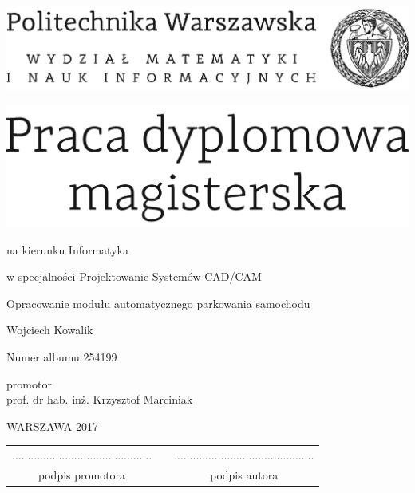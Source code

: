 \documentclass[12pt,twoside,a4paper]{article}
\newcommand{\discipline}{Informatyka}
\newcommand{\spec}{Projektowanie Systemów CAD/CAM}
\renewcommand{\title}{Opracowanie modułu automatycznego parkowania samochodu }
\renewcommand{\author}{Wojciech Kowalik}
\newcommand{\supervisor}{prof. dr hab. inż. Krzysztof Marciniak}
\newcommand{\album}{254199}
\renewcommand{\year}{2017}
\begin{document}
\pagestyle{empty}

\begin{center}
\includegraphics[scale=1.]{politechnika} 
\vspace{70pt}


\includegraphics[scale=1.]{praca_mgr} %

{ \arial na kierunku \discipline

\arial w specjalności \spec

\vspace{40pt}
{\arial \large \title}

\vspace{50pt}

{\arial \huge \author}

\vspace{5pt}

Numer albumu \album

\vspace{40pt}

promotor \\
{\arial \supervisor}

\vspace{15pt}
 

 \vfill
WARSZAWA \year \\
}
\end{center}


\newpage
\null

\vfill

\begin{center}
\begin{tabular}[t]{ccc}
............................................. & \hspace*{100pt} & .............................................\\
podpis promotora & \hspace*{100pt} & podpis autora
\end{tabular}
\end{center}
\end{document}
